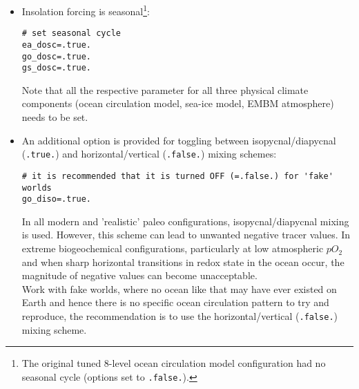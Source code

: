 \begin{itemize}[noitemsep]
\begin{itemize}[noitemsep]
\item Insolation forcing is seasonal\footnote{The original tuned 8-level ocean circulation model configuration had no seasonal cycle (options set to \texttt{.false.}).}:
\small\vspace{-2pt}\begin{verbatim}
# set seasonal cycle
ea_dosc=.true.
go_dosc=.true.
gs_dosc=.true.
\end{verbatim}\vspace{-2pt}\normalsize
Note that all the respective parameter for all three physical climate components (ocean circulation model, sea-ice model, EMBM atmosphere) needs to be set.
\vspace{1mm}
\item An additional option is provided for toggling between isopycnal/diapycnal (\texttt{.true.}) and horizontal/vertical (\texttt{.false.}) mixing schemes:
\small\vspace{-2pt}\begin{verbatim}
# it is recommended that it is turned OFF (=.false.) for 'fake' worlds
go_diso=.true.
\end{verbatim}\vspace{-2pt}\normalsize
In all modern and 'realistic' paleo configurations, isopycnal/diapycnal mixing is used. However, this scheme can lead to unwanted negative tracer values. In extreme biogeochemical configurations, particularly at low atmospheric \(pO_{2}\) and when sharp horizontal transitions in redox state in the ocean occur, the magnitude of negative values can become unacceptable.
\\Work with fake worlds, where no ocean like that may have ever existed on Earth and hence there is no specific ocean circulation pattern to try and reproduce, the recommendation is to use the horizontal/vertical (\texttt{.false.}) mixing scheme.
\end{itemize}
\vspace{1mm}


\end{itemize}

